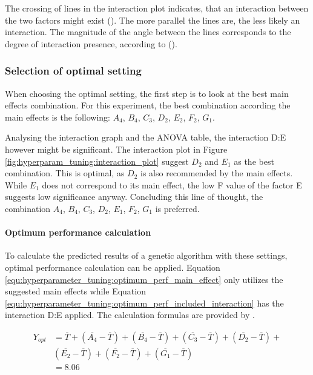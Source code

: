 The crossing of lines in the interaction plot indicates, that an interaction between the two factors might exist (\cite{field_discovering_2012}). The more parallel the lines are, the less likely an interaction. The magnitude of the angle between the lines corresponds to the degree of interaction presence, according to (\cite{roy_primer_1990}).

\subsubsection{Selection of optimal setting}
When choosing the optimal setting, the first step is to look at the best main effects combination. For this experiment, the best combination according the main effects is the following: $A_4$, $B_4$, $C_3$, $D_2$, $E_2$, $F_2$, $G_1$.

Analysing the interaction graph and the ANOVA table, the interaction D:E however might be significant. The interaction plot in Figure \ref{fig:hyperparam_tuning:interaction_plot} suggest $D_2$ and $E_1$ as the best combination. This is optimal, as $D_2$ is also recommended by the main effects. While $E_1$ does not correspond to its main effect, the low F value of the factor E suggests low significance anyway. Concluding this line of thought, the combination $A_4$, $B_4$, $C_3$, $D_2$, $E_1$, $F_2$, $G_1$ is preferred.

\paragraph{Optimum performance calculation}
\label{sect:hyperparameter_tuning:optimum_perf_caluclation}
To calculate the predicted results of a genetic algorithm with these settings, optimal performance calculation can be applied. Equation \ref{equ:hyperparameter_tuning:optimum_perf_main_effect} only utilizes the suggested main effects while Equation \ref{equ:hyperparameter_tuning:optimum_perf_included_interaction} has the interaction D:E applied. The calculation formulas are provided by \cite{roy_primer_1990}.

\begin{equation}
	\begin{split}
		Y_{opt} &= \overline{T} + (\overline{A_4} - \overline{T}) + (\overline{B_4} - \overline{T}) + (\overline{C_3} - \overline{T}) + (\overline{D_2} - \overline{T}) + \\& (\overline{E_2} - \overline{T}) + (\overline{F_2} - \overline{T}) + (\overline{G_1} - \overline{T}) \\
			&= 8.06
	\end{split}
	 \label{equ:hyperparameter_tuning:optimum_perf_main_effect}
\end{equation}


